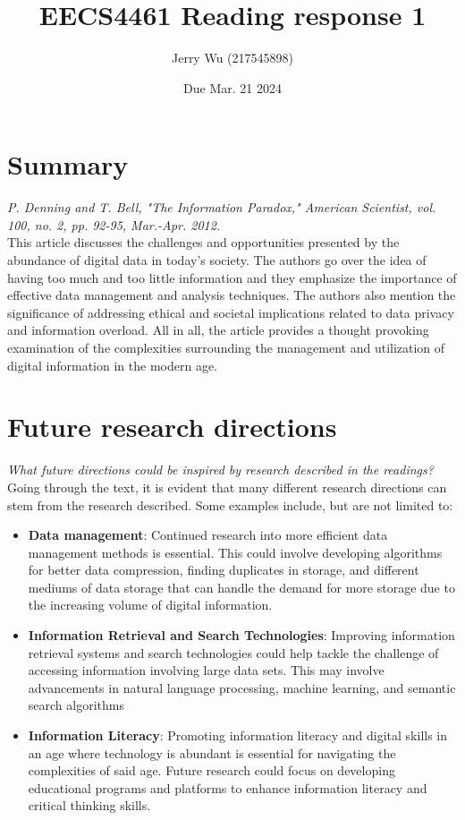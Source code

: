 \documentclass[12pt]{article}
\title{EECS4461 Reading response 1}
\author{Jerry Wu (217545898)}
\date{Due Mar. 21 2024}
\begin{document}
\maketitle

\section*{Summary}
\textit{P. Denning and T. Bell, "The Information Paradox," American Scientist, vol. 100, no. 2, pp. 92-95, Mar.-Apr. 2012.}\\

This article discusses the challenges and opportunities presented by the abundance of digital data in today's society. The authors go over the idea of having too much and too little information and they emphasize the importance of effective data management and analysis techniques. The authors also mention the significance of addressing ethical and societal implications related to data privacy and information overload. All in all, the article provides a thought provoking examination of the complexities surrounding the management and utilization of digital information in the modern age.

\section*{Future research directions}

\textit{What future directions could be inspired by research described in the readings?}\\

Going through the text, it is evident that many different research directions can stem from the research described. Some examples include, but are not limited to:


\begin{itemize}
    \item \textbf{Data management}: Continued research into more efficient data management methods is essential. This could involve developing algorithms for better data compression, finding duplicates in storage, and different mediums of data storage that can handle the demand for more storage due to the increasing volume of digital information.
    \item \textbf{Information Retrieval and Search Technologies}: Improving information retrieval systems and search technologies could help tackle the challenge of accessing information involving large data sets. This may involve advancements in natural language processing, machine learning, and semantic search algorithms
    \item \textbf{Information Literacy}: Promoting information literacy and digital skills in an age where technology is abundant is essential for navigating the complexities of said age. Future research could focus on developing educational programs and platforms to enhance information literacy and critical thinking skills.
\end{itemize}
\end{document}
